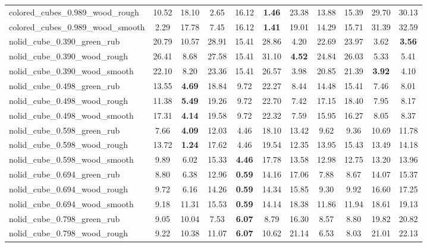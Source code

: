 \begin{table}[H]
{\begin{tabular}{l cccccccccc}
        colored\_cubes\_0.989\_wood\_rough & 10.52 & 18.10 & 2.65 & 16.12 & \textbf{1.46} & 23.38 & 13.88 & 15.39 & 29.70 & 30.13 \\
        colored\_cubes\_0.989\_wood\_smooth & 2.29 & 17.78 & 7.45 & 16.12 & \textbf{1.41} & 19.01 & 14.29 & 15.71 & 31.39 & 32.59 \\
        nolid\_cube\_0.390\_green\_rub & 20.79 & 10.57 & 28.91 & 15.41 & 28.86 & 4.20 & 22.69 & 23.97 & 3.62 & \textbf{3.56} \\
        nolid\_cube\_0.390\_wood\_rough & 26.41 & 8.68 & 27.58 & 15.41 & 31.10 & \textbf{4.52} & 24.84 & 26.03 & 5.33 & 5.41 \\
        nolid\_cube\_0.390\_wood\_smooth & 22.10 & 8.20 & 23.36 & 15.41 & 26.57 & 3.98 & 20.85 & 21.39 & \textbf{3.92} & 4.10 \\
        nolid\_cube\_0.498\_green\_rub & 13.55 & \textbf{4.69} & 18.84 & 9.72 & 22.27 & 8.44 & 14.48 & 15.41 & 7.46 & 8.01 \\
        nolid\_cube\_0.498\_wood\_rough & 11.38 & \textbf{5.49} & 19.26 & 9.72 & 22.70 & 7.42 & 17.15 & 18.40 & 7.95 & 8.17 \\
        nolid\_cube\_0.498\_wood\_smooth & 17.31 & \textbf{4.14} & 19.58 & 9.72 & 22.32 & 7.59 & 15.95 & 16.27 & 8.05 & 8.37 \\
        nolid\_cube\_0.598\_green\_rub & 7.66 & \textbf{4.09} & 12.03 & 4.46 & 18.10 & 13.42 & 9.62 & 9.36 & 10.69 & 11.78 \\
        nolid\_cube\_0.598\_wood\_rough & 13.72 & \textbf{1.24} & 17.62 & 4.46 & 19.54 & 12.35 & 13.95 & 15.43 & 13.49 & 14.18 \\
        nolid\_cube\_0.598\_wood\_smooth & 9.89 & 6.02 & 15.33 & \textbf{4.46} & 17.78 & 13.58 & 12.98 & 12.75 & 13.20 & 13.96 \\
        nolid\_cube\_0.694\_green\_rub & 8.80 & 6.38 & 12.96 & \textbf{0.59} & 14.16 & 17.06 & 7.88 & 8.67 & 14.07 & 15.37 \\
        nolid\_cube\_0.694\_wood\_rough & 9.72 & 6.16 & 14.26 & \textbf{0.59} & 14.34 & 15.85 & 9.30 & 9.92 & 16.60 & 17.25 \\
        nolid\_cube\_0.694\_wood\_smooth & 9.18 & 11.31 & 15.53 & \textbf{0.59} & 14.14 & 18.38 & 11.86 & 11.94 & 18.61 & 19.13 \\
        nolid\_cube\_0.798\_green\_rub & 9.05 & 10.04 & 7.53 & \textbf{6.07} & 8.79 & 16.30 & 8.57 & 8.80 & 19.82 & 20.82 \\
        nolid\_cube\_0.798\_wood\_rough & 9.22 & 10.38 & 11.07 & \textbf{6.07} & 10.62 & 21.14 & 6.53 & 8.03 & 21.01 & 22.13 \\

\end{tabular}}
\end{table}
